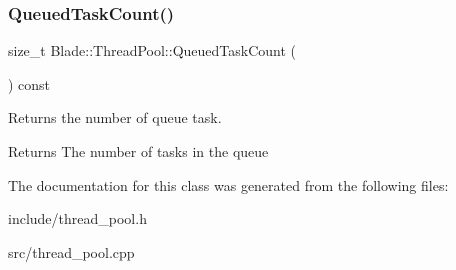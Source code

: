 \subsubsection{\texorpdfstring{Queued\+Task\+Count()}{QueuedTaskCount()}}
{\footnotesize\ttfamily size\+\_\+t Blade\+::\+Thread\+Pool\+::\+Queued\+Task\+Count (\begin{DoxyParamCaption}{ }\end{DoxyParamCaption}) const}



Returns the number of queue task. 

\begin{DoxyReturn}{Returns}
The number of tasks in the queue 
\end{DoxyReturn}


The documentation for this class was generated from the following files\+:\begin{DoxyCompactItemize}
\item 
include/thread\+\_\+pool.\+h\item 
src/thread\+\_\+pool.\+cpp\end{DoxyCompactItemize}
